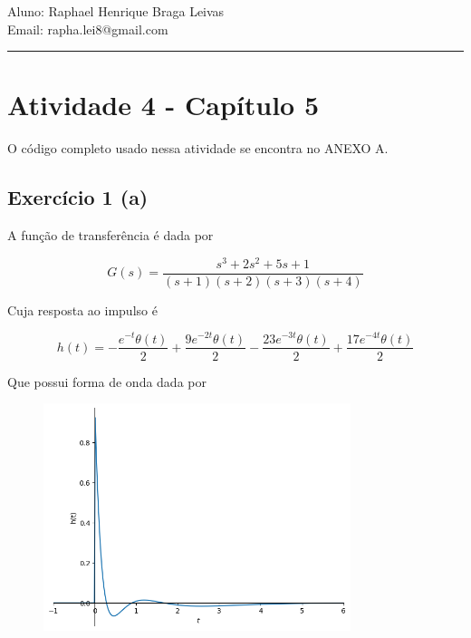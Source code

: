 \documentclass[12pt]{scrartcl}
\makeatletter
\def\today{%
  \two@digits{\the\day}/%
  \ifcase\month\or%
  01\or 02\or 03\or 04\or 05\or 06\or%
  07\or 08\or 09\or 10\or 11\or 12\fi/%
  \number\year%
}
\makeatother
\begin{document}
\pagestyle{fancy}

\fancyhead{}
\fancyhead[R]{Data: \today}
\fancyfoot{}

\begin{center}
    Aluno: Raphael Henrique Braga Leivas \\[20pt]
    Email: rapha.lei8@gmail.com
\end{center}

\hrule

\section*{Atividade 4 - Capítulo 5}

O código completo usado nessa atividade se encontra no ANEXO A.

\subsection*{Exercício 1 (a)}

A função de transferência é dada por

\[ G(s) = \frac{s^{3} + 2 s^{2} + 5 s + 1}{\left(s + 1\right) \left(s + 2\right) \left(s + 3\right) \left(s + 4\right)} \]

Cuja resposta ao impulso é

\[ h(t) = - \frac{e^{- t} \theta\left(t\right)}{2} + \frac{9 e^{- 2 t} \theta\left(t\right)}{2} - \frac{23 e^{- 3 t} \theta\left(t\right)}{2} + \frac{17 e^{- 4 t} \theta\left(t\right)}{2} \]

Que possui forma de onda dada por 

\begin{figure}[h!]
	\begin{center}
    \includegraphics[width=0.8\textwidth,trim=1 1 1 1,clip]{ex1a.png}
	\end{center}
\end{figure}
\end{document}

